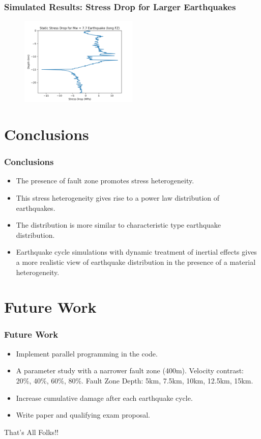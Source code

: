 \documentclass{beamer}
\begin{document}
\begin{frame}
    \frametitle{Simulated Results: Stress Drop for Larger Earthquakes}
    \begin{figure}
            \includegraphics[width=0.5\textwidth]{images/resultlongFZ/stress_drop_7} 
    \end{figure}
\end{frame}

\section{Conclusions}
\begin{frame}
    \frametitle{Conclusions}
    \begin{itemize}
        \item The presence of fault zone promotes stress heterogeneity.
        \item This stress heterogeneity gives rise to a power law distribution of earthquakes.
        \item The distribution is more similar to characteristic type earthquake distribution.
        \item Earthquake cycle simulations with dynamic treatment of inertial effects gives a more realistic view of earthquake distribution in the presence of a material heterogeneity.
        \end{itemize}
\end{frame}

\section{Future Work}
\begin{frame}
    \frametitle{Future Work}
    \begin{itemize}
        \item Implement parallel programming in the code.
        \item A parameter study with a narrower fault zone (400m). Velocity contrast: 20\%, 40\%, 60\%, 80\%. Fault Zone Depth: 5km, 7.5km, 10km, 12.5km, 15km.
        \item Increase cumulative damage after each earthquake cycle.
        \item Write paper and qualifying exam proposal.
    \end{itemize}
\end{frame}

\begin{frame}
    \Huge{\centerline{That's All Folks!!}}
\end{frame}
\end{document}

